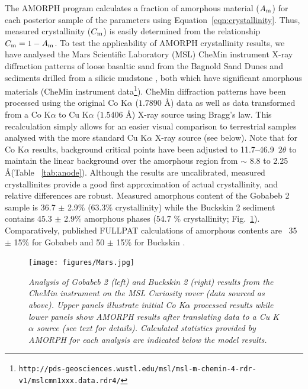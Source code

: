 \documentclass[review]{elsarticle}
\newcommand{\changed}{\color{blue}}
\begin{document}
The AMORPH program calculates a fraction of amorphous material ($A_{\rm m}$) for each posterior sample of the parameters
using Equation~\ref{eqn:crystallinity}. Thus, measured crystallinity ($C_{\rm m}$) is easily determined from the relationship $C_{\rm m} = 1-A_{\rm m}$.
{\changed To test the applicability of AMORPH crystallinity results, we have analysed the Mars Scientific Laboratory (MSL)  CheMin instrument X-ray diffraction patterns of loose basaltic sand from the Bagnold Sand Dunes \citep[Gobabeb;][]{achilles2017, lapotre2017}
and sediments drilled from a silicic mudstone \citep[Buckskin sample;][]{morris2016}, both which have significant amorphous
materials (CheMin instrument data\footnote{\tt http://pds-geosciences.wustl.edu/msl/msl-m-chemin-4-rdr-v1/mslcmn{\textunderscore}1xxx.data.rdr4/}). CheMin diffraction patterns have been processed using the original Co K$\alpha$ ($1.7890$ \AA) data as well as data transformed from a Co K$\alpha$ to Cu K$\alpha$ ($1.5406$ \AA) X-ray source using Bragg's law. This recalculation simply allows for an easier visual comparison to terrestrial samples analysed with the more standard Cu K$\alpha$ X-ray source (see below). Note that for Co K$\alpha$ results, background critical points have been adjusted to 11.7--46.9\degree~$2\theta$ to maintain the linear background over the amorphous region from $\sim$ 8.8 to 2.25 \AA (Table ~\ref{tab:anode}). Although the results are uncalibrated, measured crystallinites provide a good first approximation of actual crystallinity, and relative differences are robust. Measured amorphous content of the Gobabeb 2 sample is 36.7 $\pm$ 2.9$\%$ (63.3$\%$ crystallinity) while the Buckskin 2 sediment contains 45.3 $\pm$ 2.9$\%$ amorphous phases (54.7 $\%$ crystallinity; Fig.~\ref{fig:Mars}). Comparatively, published FULLPAT calculations of amorphous contents are ~35 $\pm$ 15$\%$ for Gobabeb and 50 $\pm$ 15$\%$ for Buckskin \citep{achilles2017, morris2016}. }

\begin{figure}[!ht]
\centering
\texttt{[image: figures/Mars.jpg]}
\caption{\it \changed Analysis of Gobabeb 2 (left) and Buckskin 2 (right) results from the CheMin instrument on the MSL Curiosity rover (data sourced as above). Upper panels  illustrate initial Co K$\alpha$ processed results while lower panels show AMORPH results after translating data to a Cu K$\alpha$ source (see text for details). Calculated statistics provided by AMORPH for each analysis are indicated below the model results.\label{fig:Mars}}
\end{figure}
\end{document}
